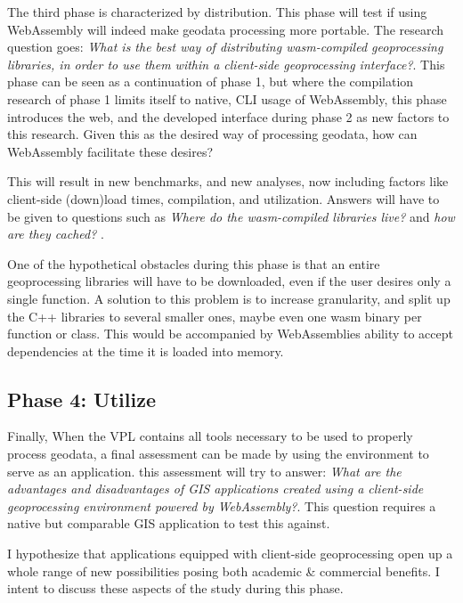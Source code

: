 

The third phase is characterized by distribution. 
This phase will test if using WebAssembly will indeed make geodata processing more portable.  
The research question goes: \textit{What is the best way of distributing wasm-compiled geoprocessing libraries, in order to use them within a client-side geoprocessing interface?}. 
This phase can be seen as a continuation of phase 1, but where the compilation research of phase 1 limits itself to native, CLI usage of WebAssembly, this phase introduces the web, and the developed interface during phase 2 as new factors to this research. Given this as the desired way of processing geodata, how can WebAssembly facilitate these desires? 

This will result in new benchmarks, and new analyses, now including factors like client-side (down)load times, compilation, and utilization. Answers will have to be given to questions such as \textit{Where do the wasm-compiled libraries live?} and \textit{ how are they cached? }.

One of the hypothetical obstacles during this phase is that an entire geoprocessing libraries will have to be downloaded, even if the user desires only a single function. A solution to this problem is to increase granularity, and split up the C++ libraries to several smaller ones, maybe even one wasm binary per function or class. This would be accompanied by WebAssemblies ability to accept dependencies at the time it is loaded into memory. 




\subsection{Phase 4: Utilize}

Finally, When the VPL contains all tools necessary to be used to properly process geodata, a final assessment can be made by using the environment to serve as an application. this assessment will try to answer: \textit{What are the advantages and disadvantages of GIS applications created using a client-side geoprocessing environment powered by WebAssembly?}. This question requires a native but comparable GIS application to test this against.  


I hypothesize that applications equipped with client-side geoprocessing open up a whole range of new possibilities posing both academic \& commercial benefits. 
I intent to discuss these aspects of the study during this phase. 



